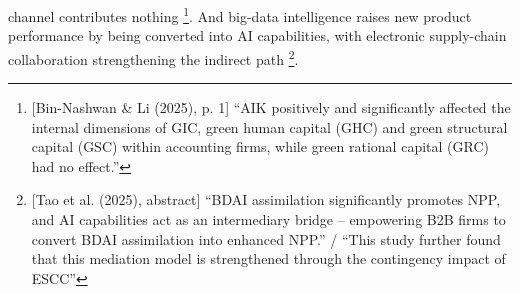 channel contributes nothing \parencite[p.~1]{binnashwan2025infused}\footnote{[Bin-Nashwan \& Li (2025), p. 1] ``AIK positively and significantly affected the internal dimensions of GIC, green human capital (GHC) and green structural capital (GSC) within accounting firms, while green rational capital (GRC) had no effect.''}. And big-data intelligence raises new product performance by being converted into AI capabilities, with electronic supply-chain collaboration strengthening the indirect path \parencite[abstract]{tao2025data}\footnote{[Tao et al. (2025), abstract] ``BDAI assimilation significantly promotes NPP, and AI capabilities act as an intermediary bridge -- empowering B2B firms to convert BDAI assimilation into enhanced NPP.'' / ``This study further found that this mediation model is strengthened through the contingency impact of ESCC''}.

